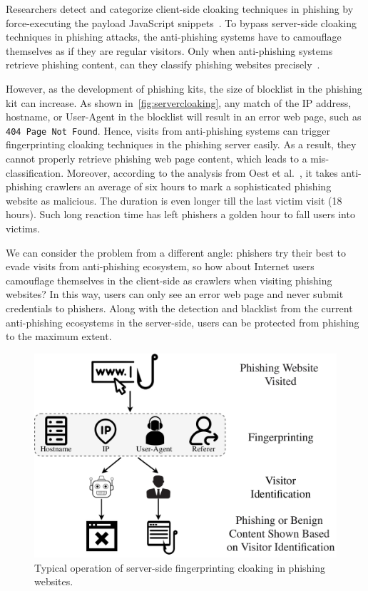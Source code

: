 Researchers detect and categorize client-side cloaking techniques in phishing by force-executing the payload JavaScript snippets~\cite{zhang2021crawlphish}.
To bypass server-side cloaking techniques in phishing attacks, the anti-phishing systems have to camouflage themselves as if they are regular visitors.
Only when anti-phishing systems retrieve phishing content, can they classify phishing websites precisely~\cite{xiang2011cantina+,whittaker2010large,smartscreen}.

However, as the development of phishing kits, the size of blocklist in the phishing kit can increase.
As shown in~\autoref{fig:servercloaking}, any match of the IP address, hostname, or User-Agent in the blocklist will result in an error web page, such as \texttt{404 Page Not Found}.
Hence, visits from anti-phishing systems can trigger fingerprinting cloaking techniques in the phishing server easily.
As a result, they cannot properly retrieve phishing web page content, which leads to a mis-classification.
Moreover, according to the analysis from Oest et al.~\cite{oest2020sunrise}, it takes anti-phishing crawlers an average of six hours to mark a sophisticated phishing website as malicious.
The duration is even longer till the last victim visit (18 hours).
Such long reaction time has left phishers a golden hour to fall users into victims.

We can consider the problem from a different angle: phishers try their best to evade visits from anti-phishing ecosystem, so how about Internet users camouflage themselves in the client-side as crawlers when visiting phishing websites?
In this way, users can only see an error web page and never submit credentials to phishers.
Along with the detection and blacklist from the current anti-phishing ecosystems in the server-side,
users can be protected from phishing to the maximum extent.




\begin{figure}
\centering
\includegraphics[width=.9\linewidth]{figs/fp_cloaking.pdf}
\caption{Typical operation of server-side fingerprinting cloaking in phishing websites.}
\label{fig:fp_cloaking}
\end{figure}